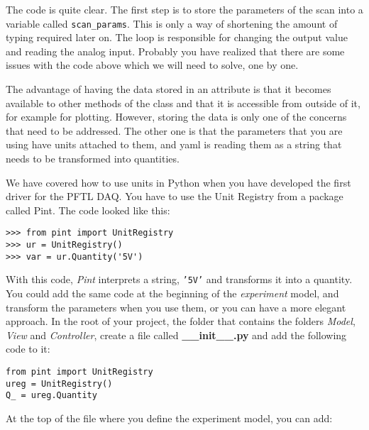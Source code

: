 The code is quite clear. The first step is to store the parameters of the scan into a variable called \texttt{scan_params}. This is only a way of shortening the amount of typing required later on. The loop is responsible for changing the output value and reading the analog input. Probably you have realized that there are some issues with the code above which we will need to solve, one by one.


The advantage of having the data stored in an attribute is that it becomes available to other methods of the class and that it is accessible from outside of it, for example for plotting. However,
storing the data is only one of the concerns that need to be addressed. The other one is that the parameters that you are using have units attached to them, and yaml is reading them as a string that needs to be
transformed into quantities.

We have covered how to use units in Python when you have developed the first driver for the {PFTL} {DAQ}. You have to use the Unit Registry from a package called Pint. The code looked like this:

\begin{verbatim}
>>> from pint import UnitRegistry
>>> ur = UnitRegistry()
>>> var = ur.Quantity('5V')
\end{verbatim}

With this code, \emph{Pint} interprets a string, \texttt{'5V'} and transforms it into a quantity. You could add the same code at the beginning of the \emph{experiment} model, and transform the parameters when you use them, or you can have a more elegant approach. In the root of your project, the folder that contains the folders \emph{Model}, \emph{View} and \emph{Controller}, create a file called \textbf{\_\_init\_\_.py} and add the following code to it:

\begin{verbatim}
from pint import UnitRegistry
ureg = UnitRegistry()
Q_ = ureg.Quantity
\end{verbatim}

At the top of the file where you define the experiment model, you can add:

